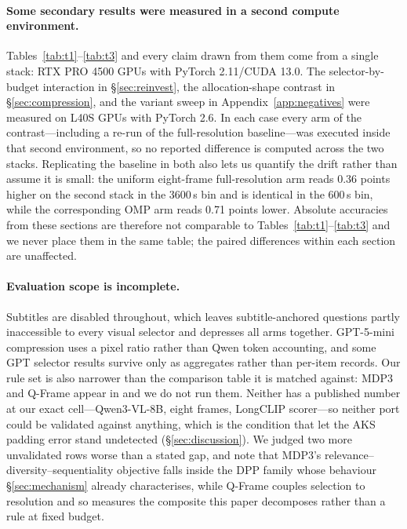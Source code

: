 \documentclass[11pt]{article}
\begin{document}
\paragraph{Some secondary results were measured in a second compute environment.}
Tables~\ref{tab:t1}--\ref{tab:t3} and every claim drawn from them come from a single stack: RTX PRO 4500 GPUs with PyTorch 2.11/CUDA 13.0.
The selector-by-budget interaction in \S\ref{sec:reinvest}, the allocation-shape contrast in \S\ref{sec:compression}, and the variant sweep in Appendix~\ref{app:negatives} were measured on L40S GPUs with PyTorch 2.6.
In each case every arm of the contrast---including a re-run of the full-resolution baseline---was executed inside that second environment, so no reported difference is computed across the two stacks.
Replicating the baseline in both also lets us quantify the drift rather than assume it is small: the uniform eight-frame full-resolution arm reads 0.36 points higher on the second stack in the 3600\,s bin and is identical in the 600\,s bin, while the corresponding OMP arm reads 0.71 points lower.
Absolute accuracies from these sections are therefore not comparable to Tables~\ref{tab:t1}--\ref{tab:t3} and we never place them in the same table; the paired differences within each section are unaffected.

\paragraph{Evaluation scope is incomplete.}
Subtitles are disabled throughout, which leaves subtitle-anchored questions partly inaccessible to every visual selector and depresses all arms together.
GPT-5-mini compression uses a pixel ratio rather than Qwen token accounting, and some GPT selector results survive only as aggregates rather than per-item records.
Our rule set is also narrower than the comparison table it is matched against: MDP3 and Q-Frame appear in \citet{chen2026lddr} and we do not run them.
Neither has a published number at our exact cell---Qwen3-VL-8B, eight frames, LongCLIP scorer---so neither port could be validated against anything, which is the condition that let the AKS padding error stand undetected (\S\ref{sec:discussion}).
We judged two more unvalidated rows worse than a stated gap, and note that MDP3's relevance--diversity--sequentiality objective falls inside the DPP family whose behaviour \S\ref{sec:mechanism} already characterises, while Q-Frame couples selection to resolution and so measures the composite this paper decomposes rather than a rule at fixed budget.
\end{document}
